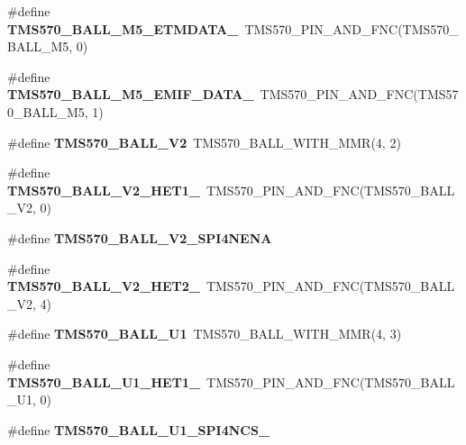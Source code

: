 \begin{DoxyCompactItemize}
\#define {\bfseries T\+M\+S570\+\_\+\+B\+A\+L\+L\+\_\+\+M5\+\_\+\+E\+T\+M\+D\+A\+T\+A\+\_}~T\+M\+S570\+\_\+\+P\+I\+N\+\_\+\+A\+N\+D\+\_\+\+F\+NC(T\+M\+S570\+\_\+\+B\+A\+L\+L\+\_\+\+M5, 0)
\item 
\mbox{\label{tms570ls3137zwt-pins_8h_acd382f78181a2bc8152961df3b2f14d1}} 
\#define {\bfseries T\+M\+S570\+\_\+\+B\+A\+L\+L\+\_\+\+M5\+\_\+\+E\+M\+I\+F\+\_\+\+D\+A\+T\+A\+\_}~T\+M\+S570\+\_\+\+P\+I\+N\+\_\+\+A\+N\+D\+\_\+\+F\+NC(T\+M\+S570\+\_\+\+B\+A\+L\+L\+\_\+\+M5, 1)
\item 
\mbox{\label{tms570ls3137zwt-pins_8h_ac6e4e9a41dceccab962876360adc9192}} 
\#define {\bfseries T\+M\+S570\+\_\+\+B\+A\+L\+L\+\_\+\+V2}~T\+M\+S570\+\_\+\+B\+A\+L\+L\+\_\+\+W\+I\+T\+H\+\_\+\+M\+MR(4, 2)
\item 
\mbox{\label{tms570ls3137zwt-pins_8h_a146f1e98c1797e85776d43991649131a}} 
\#define {\bfseries T\+M\+S570\+\_\+\+B\+A\+L\+L\+\_\+\+V2\+\_\+\+H\+E\+T1\+\_}~T\+M\+S570\+\_\+\+P\+I\+N\+\_\+\+A\+N\+D\+\_\+\+F\+NC(T\+M\+S570\+\_\+\+B\+A\+L\+L\+\_\+\+V2, 0)
\item 
\#define {\bfseries T\+M\+S570\+\_\+\+B\+A\+L\+L\+\_\+\+V2\+\_\+\+S\+P\+I4\+N\+E\+NA}
\item 
\mbox{\label{tms570ls3137zwt-pins_8h_ad48c066fa21c0dc87124325617e51f29}} 
\#define {\bfseries T\+M\+S570\+\_\+\+B\+A\+L\+L\+\_\+\+V2\+\_\+\+H\+E\+T2\+\_}~T\+M\+S570\+\_\+\+P\+I\+N\+\_\+\+A\+N\+D\+\_\+\+F\+NC(T\+M\+S570\+\_\+\+B\+A\+L\+L\+\_\+\+V2, 4)
\item 
\mbox{\label{tms570ls3137zwt-pins_8h_aca861b119f555423ab961b3fda2f0063}} 
\#define {\bfseries T\+M\+S570\+\_\+\+B\+A\+L\+L\+\_\+\+U1}~T\+M\+S570\+\_\+\+B\+A\+L\+L\+\_\+\+W\+I\+T\+H\+\_\+\+M\+MR(4, 3)
\item 
\mbox{\label{tms570ls3137zwt-pins_8h_a7d8486b03b3765b9da05175b80fd52c3}} 
\#define {\bfseries T\+M\+S570\+\_\+\+B\+A\+L\+L\+\_\+\+U1\+\_\+\+H\+E\+T1\+\_}~T\+M\+S570\+\_\+\+P\+I\+N\+\_\+\+A\+N\+D\+\_\+\+F\+NC(T\+M\+S570\+\_\+\+B\+A\+L\+L\+\_\+\+U1, 0)
\item 
\#define {\bfseries T\+M\+S570\+\_\+\+B\+A\+L\+L\+\_\+\+U1\+\_\+\+S\+P\+I4\+N\+C\+S\+\_}

\end{DoxyCompactItemize}
